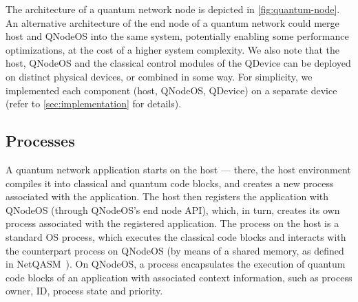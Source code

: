 The architecture of a quantum network node is depicted in \cref{fig:quantum-node}. An alternative
architecture of the end node of a quantum network could merge host and QNodeOS into the same system,
potentially enabling some performance optimizations, at the cost of a higher system complexity. We
also note that the host, QNodeOS and the classical control modules of the QDevice can be deployed on
distinct physical devices, or combined in some way. For simplicity, we implemented each component
(host, QNodeOS, QDevice) on a separate device (refer to \cref{sec:implementation} for details).

\subsection{Processes}

A quantum network application starts on the host --- there, the host environment compiles it into
classical and quantum code blocks, and creates a new process associated with the application. The
host then registers the application with QNodeOS (through QNodeOS's end node API), which, in turn,
creates its own process associated with the registered application. The process on the host is a
standard OS process, which executes the classical code blocks and interacts with the counterpart
process on QNodeOS (by means of a shared memory, as defined in
NetQASM~\cite{dahlberg_2022_netqasm}). On QNodeOS, a process encapsulates the execution of quantum
code blocks of an application with associated context information, such as process owner, ID,
process state and priority.

